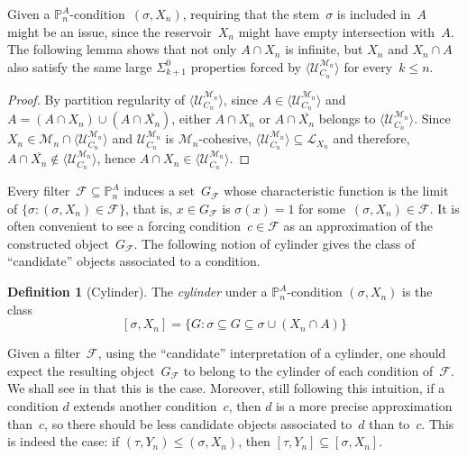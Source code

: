 \documentclass{article}
\def\PP{\mathbb{P}}
\def\F{\mathcal{F}}
\def\U{\mathcal{U}}
\def\M{\mathcal{M}}
\def\PP{\mathbb{P}}
\renewcommand{\L}[0]{\mathcal{L}}
\def\qt#1{``#1''}%
\numberwithin{theorem}{section}
\newtheorem{lemma}[theorem]{Lemma}
\theoremstyle{definition}
\newtheorem{definition}[theorem]{Definition}
\begin{document}
Given a $\PP^A_n$-condition~$(\sigma, X_n)$, requiring that the stem~$\sigma$ is included in~$A$ might be an issue, since the reservoir~$X_n$ might have empty intersection with~$A$. The following lemma shows that not only $A \cap X_n$ is infinite, but $X_n$ and $X_n \cap A$ also satisfy the same large $\Sigma^0_{k+1}$ properties forced by $\langle \U_{C_n}^{\M_n} \rangle$ for every~$k \leq n$.

\begin{proof}
    By partition regularity of $\langle \U_{C_n}^{\M_n} \rangle$, since $A \in \langle \U_{C_n}^{\M_n} \rangle$ and $A = (A \cap X_n) \cup (A \cap \overline{X_n})$, either $A \cap X_n$ or $A \cap \overline{X_n}$ belongs to $\langle \U_{C_n}^{\M_n} \rangle$. Since $X_n \in \M_n \cap \langle \U_{C_n}^{\M_n} \rangle$ and $\U_{C_n}^{\M_n}$ is $\M_n$-cohesive, $\langle \U_{C_n}^{\M_n} \rangle \subseteq \L_{X_n}$ and therefore, $A \cap \overline{X_n} \notin \langle \U_{C_n}^{\M_n} \rangle$, hence $A \cap X_n \in \langle \U_{C_n}^{\M_n} \rangle$.
\end{proof}

Every filter~$\F \subseteq \PP^A_n$ induces a set~$G_\F$ whose characteristic function is the limit of $\{\sigma : (\sigma, X_n) \in \F\}$, that is, $x \in G_\F$ is $\sigma(x) = 1$ for some~$(\sigma, X_n) \in \F$.
It is often convenient to see a forcing condition~$c \in \F$ as an approximation of the constructed object~$G_\F$. The following notion of cylinder gives the class of \qt{candidate} objects associated to a condition.

\begin{definition}[Cylinder]
The \textit{cylinder} under a $\PP^A_n$-condition $(\sigma,X_n)$ is the class 
$$[\sigma, X_n] = \{G : \sigma \subseteq G \subseteq \sigma \cup (X_n \cap A)\}$$
\end{definition}

Given a filter~$\F$, using the \qt{candidate} interpretation of a cylinder, one should expect the resulting object~$G_\F$ to belong to the cylinder of each condition of~$\F$. We shall see in  that this is the case.
Moreover, still following this intuition, if a condition $d$ extends another condition~$c$, then $d$ is a more precise approximation than~$c$, so there should be less candidate objects associated to~$d$ than to~$c$. This is indeed the case: if $(\tau, Y_n) \leq (\sigma, X_n)$, then $[\tau, Y_n] \subseteq [\sigma, X_n]$. 
\end{document}
